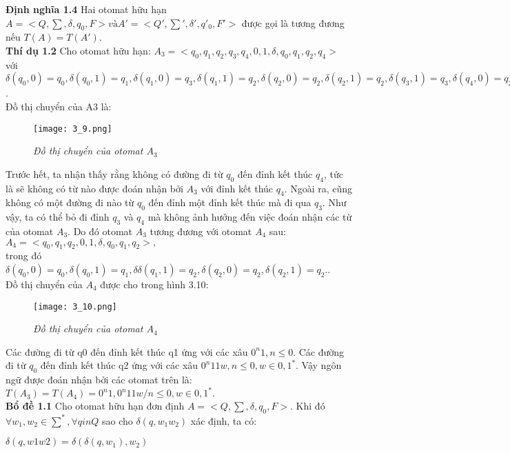 \begin{flushleft}
\textbf{Định nghĩa 1.4} Hai otomat hữu hạn $A = <Q, \sum, \delta, q_0, F> và A'= <Q', \sum', \delta', q'_0, F'>$ được gọi là tương đương nếu $T(A) = T(A')$.\\
\textbf{Thí dụ 1.2} Cho otomat hữu hạn: $A_3 = <{q_0, q_1, q_2, q_3, q_4},{0, 1}, \delta, q_0, {q_1, q_2, q_4}>$ với $\delta(q_0,0) = q_0, \delta(q_0,1) = q_1, \delta(q_1,0) = q_3, \delta(q_1,1) = q_2, \delta(q_2,0) = q_2, \delta(q_2,1) = q_2, \delta(q_3,1) = q_3, \delta(q_4,0) = q_2, \delta(q_4,1) = q_3.$.\\
\hspace{10mm}Đồ thị chuyển của A3 là:\\
\begin{figure}[ht]
\texttt{[image: 3\_9.png]}
\caption{ \textit{Đồ thị chuyển của otomat $A_3$}}
\end{figure}

Trước hết, ta nhận thấy rằng không có đường đi từ $q_0$ đến đỉnh kết thúc $q_4$, tức là sẽ không có từ nào được đoán nhận bởi $A_3$ với đỉnh kết thúc $q_4$. Ngoài ra, cũng không có một đường đi nào từ $q_0$ đến đỉnh một đỉnh kết thúc mà đi qua $q_3$. Như vậy, ta có thể bỏ đi đỉnh $q_3$ và $q_4$ mà không ảnh hưởng đến việc đoán nhận các từ của otomat $A_3$. Do đó otomat $A_3$ tương đương với otomat $A_4$ sau: \\
$A_4 = <{q_0, q_1, q_2}, {0, 1}, \delta, q_0, {q_1, q_2}>,$\\
trong đó $\delta(q_0,0) = q_0, \delta(q_0,1) = q_1, \delta\delta(q_1,1) = q_2, \delta(q_2,0) = q_2, \delta(q_2,1) = q_2.$.\\
Đồ thị chuyển của $A_4$ được cho trong hình 3.10:\\
\begin{figure}[ht]
\texttt{[image: 3\_10.png]}
\caption{ \textit{Đồ thị chuyển của otomat $A_4$}}
\end{figure}
Các đường đi từ q0 đến đỉnh kết thúc q1 ứng với các xâu $0^n1, n \le 0$. Các đường đi từ $q_0$ đến đỉnh kết thúc q2 ứng với các xâu $0^n11w, n \le 0, w \in {0, 1}^*$. Vậy ngôn ngữ được đoán nhận bởi các otomat trên là: \\
$T(A_3) = T(A_4) = {0^n1, 0^n11w / n \le 0, w \in {0, 1}^*}.$ \\
\textbf{Bổ đề 1.1} Cho otomat hữu hạn đơn định $A = <Q, \sum, \delta, q_0, F>.$  Khi đó $\forall w_1, w_2 \in \sum^*, \forall q in Q$ sao cho $\delta(q, w_1w_2)$ xác định, ta có:\\
\end{flushleft}
$\delta(q, w1w2) = \delta(\delta(q, w_1), w_2)$\\
